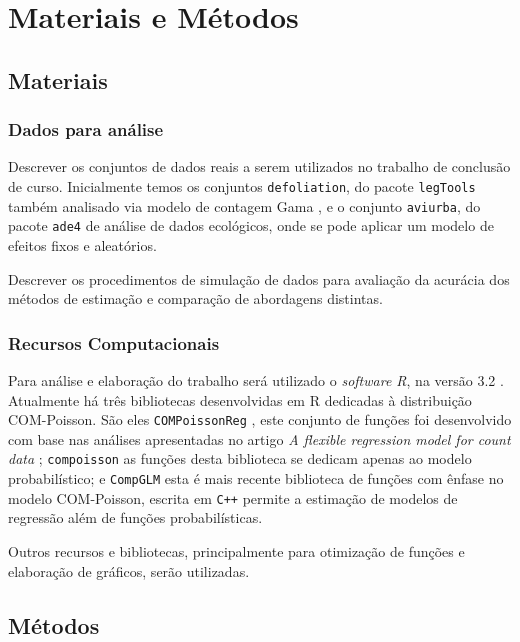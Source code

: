\documentclass[
	12pt,				%
	openright,			%
	oneside,			%
	a4paper,			%
	english,			%
	brazil,				%
	]{abntex2}
\begin{document}
\chapter{Materiais e Métodos}
\section{Materiais}

\subsection{Dados para análise}

Descrever os conjuntos de dados reais a serem utilizados no 
trabalho de conclusão de curso. Inicialmente temos os 
conjuntos \texttt{defoliation}, do pacote \texttt{legTools}
também analisado via modelo de contagem Gama 
\cite{Zeviani2014}, e o conjunto \texttt{aviurba}, do pacote
\texttt{ade4} de análise de dados ecológicos, onde se pode 
aplicar um modelo de efeitos fixos e aleatórios.

Descrever os procedimentos de simulação de dados para 
avaliação da acurácia dos métodos de estimação e comparação 
de abordagens distintas.

\subsection{Recursos Computacionais}

Para análise e elaboração do trabalho será utilizado o
\textit{software R}, na versão 3.2 \cite{Rcore2015}. 
Atualmente há três bibliotecas desenvolvidas em R dedicadas
à distribuição COM-Poisson. São eles \texttt{COMPoissonReg}
\cite{COMPoissonReg}, este conjunto de funções foi 
desenvolvido com base nas análises apresentadas no artigo
\textit{A flexible regression model for count data} 
\cite{Sellers2010}; \texttt{compoisson} as funções desta 
biblioteca se dedicam apenas ao modelo probabilístico; e
\texttt{CompGLM} esta é mais recente biblioteca de funções 
com ênfase no modelo COM-Poisson, escrita em \texttt{C++}
permite a estimação de modelos de regressão além de funções 
probabilísticas.

Outros recursos e bibliotecas, principalmente para 
otimização de funções e elaboração de gráficos, serão 
utilizadas.

\section{Métodos}
\end{document}
